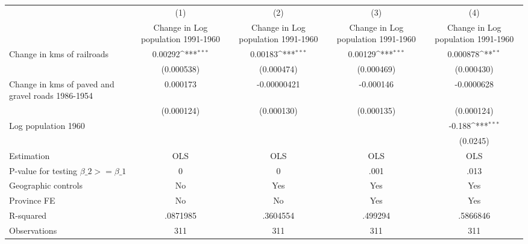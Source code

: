 {
\def\sym#1{\ifmmode^{#1}\else\(^{#1}\)\fi}
\begin{tabular}{l*{4}{c}}
\hline\hline
                &\multicolumn{1}{c}{(1)}&\multicolumn{1}{c}{(2)}&\multicolumn{1}{c}{(3)}&\multicolumn{1}{c}{(4)}\\
                &\multicolumn{1}{c}{Change in Log population 1991-1960}&\multicolumn{1}{c}{Change in Log population 1991-1960}&\multicolumn{1}{c}{Change in Log population 1991-1960}&\multicolumn{1}{c}{Change in Log population 1991-1960}\\
\hline
Change in kms of railroads&  0.00292\sym{***}&  0.00183\sym{***}&  0.00129\sym{***}& 0.000878\sym{**} \\
                &(0.000538)         &(0.000474)         &(0.000469)         &(0.000430)         \\
[1em]
Change in kms of paved and gravel roads 1986-1954& 0.000173         &-0.00000421         &-0.000146         &-0.0000628         \\
                &(0.000124)         &(0.000130)         &(0.000135)         &(0.000124)         \\
[1em]
Log population 1960&                  &                  &                  &   -0.188\sym{***}\\
                &                  &                  &                  & (0.0245)         \\
\hline
Estimation      &      OLS         &      OLS         &      OLS         &      OLS         \\
P-value for testing $\beta\_2 >= \beta\_1$&        0         &        0         &     .001         &     .013         \\
Geographic controls&       No         &      Yes         &      Yes         &      Yes         \\
Province FE     &       No         &       No         &      Yes         &      Yes         \\
R-squared       & .0871985         & .3604554         &  .499294         & .5866846         \\
Observations    &      311         &      311         &      311         &      311         \\
\hline\hline
\end{tabular}
}
